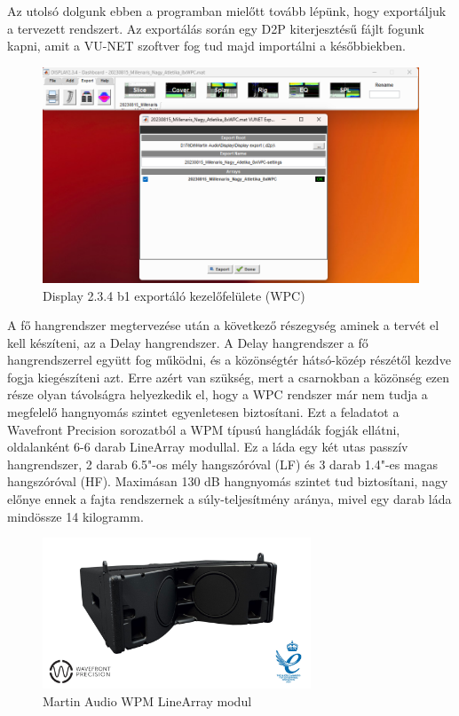 Az utolsó dolgunk ebben a programban mielőtt tovább lépünk, hogy exportáljuk a tervezett rendszert.
Az exportálás során egy D2P kiterjesztésű fájlt fogunk kapni, amit a VU-NET szoftver fog tud majd importálni a későbbiekben.
\begin{figure}[H]
	\centering
	\includegraphics[width=\textwidth, keepaspectratio]{figures/display_wpc_7.png}
	\caption{Display 2.3.4 b1 exportáló kezelőfelülete (WPC)}\label{fig:display_wpc_7}
\end{figure}
A fő hangrendszer megtervezése után a következő részegység aminek a tervét el kell készíteni, az a Delay hangrendszer.
A Delay hangrendszer a fő hangrendszerrel együtt fog működni, és a közönségtér hátsó-közép részétől kezdve fogja kiegészíteni azt.
Erre azért van szükség, mert a csarnokban a közönség ezen része olyan távolságra helyezkedik el, hogy
a WPC rendszer már nem tudja a megfelelő hangnyomás szintet egyenletesen biztosítani.
Ezt a feladatot a Wavefront Precision sorozatból a WPM típusú hangládák fogják ellátni, oldalanként 6-6 darab LineArray modullal.
Ez a láda egy két utas passzív hangrendszer, 2 darab 6.5"-os mély hangszóróval (LF) és 3 darab 1.4"-es magas hangszóróval (HF). 
Maximásan 130 dB hangnyomás szintet tud biztosítani, nagy előnye ennek a fajta rendszernek a súly-teljesítmény aránya, mivel egy
darab láda mindössze 14 kilogramm. \cite{WPMUSERGUIDE}
\begin{figure}[H]
	\centering
	\includegraphics[width=80mm, keepaspectratio]{figures/wpm_front_view.jpg}
	\caption{Martin Audio WPM LineArray modul}\label{fig:wpm}
\end{figure}

